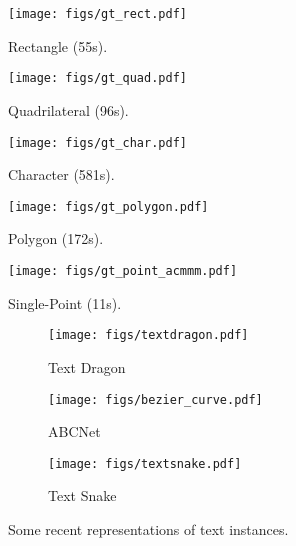 \documentclass[sigconf]{acmart}
\begin{document}
\begin{figure*}[t!]
    \centering
    \begin{subfigure}{0.18\linewidth}
        \texttt{[image: figs/gt\_rect.pdf]}
        \caption{Rectangle (55s).} \label{fig:tgt_rect}
    \end{subfigure}
    \begin{subfigure}{0.18\linewidth}
        \texttt{[image: figs/gt\_quad.pdf]}
        \caption{Quadrilateral (96s).} \label{fig:tgt_quad}
    \end{subfigure}
    \begin{subfigure}{0.18\linewidth}
        \texttt{[image: figs/gt\_char.pdf]}
        \caption{Character (581s).} \label{fig:tgt_char}
    \end{subfigure}
    \begin{subfigure}{0.18\linewidth}
        \texttt{[image: figs/gt\_polygon.pdf]}
        \caption{Polygon (172s).}
        \label{fig:tgt_poly} \end{subfigure}
    \begin{subfigure}{0.18\linewidth}
        \texttt{[image: figs/gt\_point\_acmmm.pdf]}
        \caption{Single-Point (11s).}
        \label{fig:tgt_point} \end{subfigure}
    \caption{Different annotation styles and their time cost (for all the text instances in the sample image) measured by the LabelMe\protect\footnotemark  tool. Green areas are positive samples, while red dashed boxes are noises that may be possibly included. The time cost of single-point annotation is more than 50 times faster than character-level annotation.}
    \label{fig:trn_tgt}
\end{figure*}

\begin{figure}[t!]
\centering
    \begin{subfigure}{0.325\linewidth}
        \texttt{[image: figs/textdragon.pdf]}
        \caption{Text Dragon~\cite{feng2019textdragon}}
        \label{fig:textdragon}
    \end{subfigure}
    \begin{subfigure}{0.325\linewidth}
        \texttt{[image: figs/bezier\_curve.pdf]}
        \caption{ABCNet~\cite{liu2020abcnet}}
        \label{fig:bzcurve}
    \end{subfigure}
    \begin{subfigure}{0.325\linewidth}
        \texttt{[image: figs/textsnake.pdf]}
        \caption{Text Snake~\cite{long2018textsnake}}
        \label{fig:textsnake}
    \end{subfigure}
\caption{Some recent representations of text instances.}
    \label{fig:novel_representations}
\end{figure}
\end{document}
